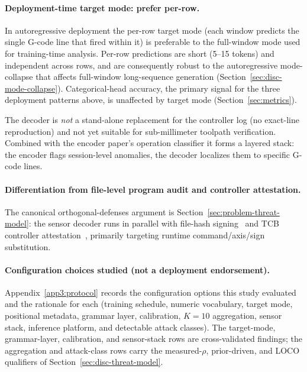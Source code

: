 \documentclass[sensors,article,submit,moreauthors,pdftex]{Definitions/mdpi}
\begin{document}
\paragraph{Deployment-time target mode: prefer per-row.} In autoregressive deployment the per-row target mode (each window predicts the single G-code line that fired within it) is preferable to the full-window mode used for training-time analysis. Per-row predictions are short (5--15 tokens) and independent across rows, and are consequently robust to the autoregressive mode-collapse that affects full-window long-sequence generation (Section~\ref{sec:disc-mode-collapse}). Categorical-head accuracy, the primary signal for the three deployment patterns above, is unaffected by target mode (Section~\ref{sec:metrics}).

The decoder is \emph{not} a stand-alone replacement for the controller log (no exact-line reproduction) and not yet suitable for sub-millimeter toolpath verification. Combined with the encoder paper's operation classifier it forms a layered stack: the encoder flags session-level anomalies, the decoder localizes them to specific G-code lines.

\paragraph{Differentiation from file-level program audit and controller attestation.} The canonical orthogonal-defenses argument is Section~\ref{sec:problem-threat-model}: the sensor decoder runs in parallel with file-hash signing~\cite{wells2014cyber,nist2024fmnet,belikovetsky2017drowned} and TCB controller attestation~\cite{zonouz2014plc}, primarily targeting runtime command/axis/sign substitution.

\paragraph{Configuration choices studied (not a deployment endorsement).} Appendix~\ref{app3:protocol} records the configuration options this study evaluated and the rationale for each (training schedule, numeric vocabulary, target mode, positional metadata, grammar layer, calibration, $K\!=\!10$ aggregation, sensor stack, inference platform, and detectable attack classes). The target-mode, grammar-layer, calibration, and sensor-stack rows are cross-validated findings; the aggregation and attack-class rows carry the measured-$\rho$, prior-driven, and LOCO qualifiers of Section~\ref{sec:disc-threat-model}.
\end{document}
